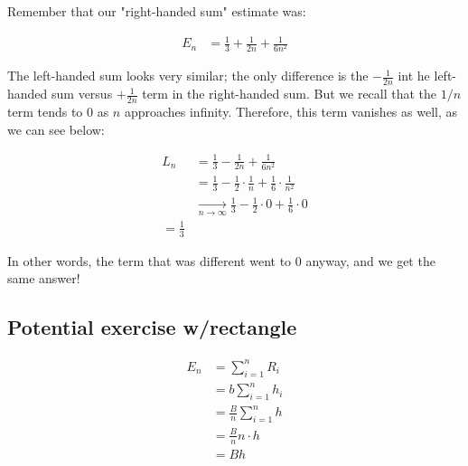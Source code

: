 \documentclass{article}
\begin{document}
Remember that our "right-handed sum" estimate was:

\begin{align*}
E_n &= \frac{1}{3} + \frac{1}{2n} + \frac{1}{6n^2}
\end{align*}

The left-handed sum looks very similar; the only difference is the $- \frac{1}{2n}$ int he left-handed sum versus $+ \frac{1}{2n}$ term in the right-handed sum. But we recall that the $1/n$ term tends to 0 as $n$ approaches infinity. Therefore, this term vanishes as well, as we can see below: 

\begin{align*}
L_n &= \frac{1}{3} - \frac{1}{2n} + \frac{1}{6n^2} \\
&= \frac{1}{3} - \frac{1}{2} \cdot \frac{1}{n} + \frac{1}{6} \cdot \frac{1}{n^2} \\
&\xrightarrow[n \to \infty]{} \frac{1}{3} - \frac{1}{2} \cdot 0 + \frac{1}{6} \cdot 0 \\
= \frac{1}{3}
\end{align*}

In other words, the term that was different went to 0 anyway, and we get the same answer! 



\subsection{Potential exercise w/rectangle}

\begin{align*}
E_n &= \sum_{i=1}^n R_i \\
&= b \sum_{i=1}^n h_i \\
&= \frac{B}{n} \sum_{i=1}^n h \\
&= \frac{B}{n} n \cdot h \\
&= Bh \\
\end{align*}
\end{document}
